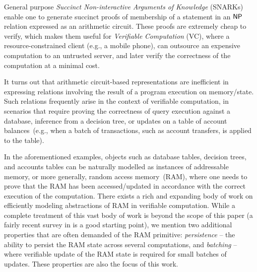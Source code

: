 General purpose {\em Succinct Non-interactive Arguments of Knowledge} (SNARKs) enable one to generate succinct
proofs of membership of a statement in an $\mathsf{NP}$ relation expressed as an arithmetic circuit. These proofs are
extremely cheap to verify, which makes them useful for {\em Verifiable Computation} (VC), where a resource-constrained
client (e.g., a mobile phone), can outsource an expensive computation to an untrusted server, and later
verify the correctness of the computation at a minimal cost.

\medskip

 It turns out that arithmetic circuit-based representations are inefficient in expressing relations involving the result of a program execution on memory/state. Such relations frequently arise in the context of verifiable computation, in scenarios that require proving the correctness of query execution against a database, inference from a decision tree, or updates on a table of account balances~(e.g., when a batch of transactions, such as account transfers, is applied to the table).

In the aforementioned examples, objects such as database tables, decision trees, and accounts tables can be naturally
modelled as instances of addressable memory, or more generally, random access memory~(RAM), where one needs to prove that the RAM has been accessed/updated in accordance with the correct execution of the computation. There exists a rich and expanding body of work on efficiently modeling abstractions of RAM in verifiable computation. While a complete treatment of this vast body of work is beyond
the scope of this paper (a fairly recent survey in \cite{WB15} is a good starting point), we mention two additional properties that are often demanded of the RAM primitive: {\em persistence} -- the ability to persist the RAM state across several computations, and {\em batching} --
where verifiable update of the RAM state is required for small batches of updates. These properties are also the focus of this work.


\medskip

